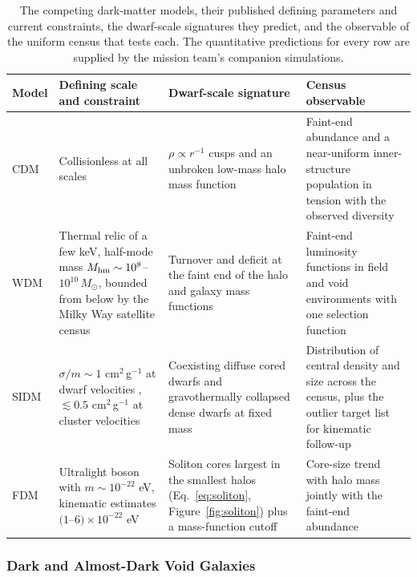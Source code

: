 \begin{table}[htbp]
\centering
\sffamily\small
\begin{tabularx}{\textwidth}{@{}p{1.3cm}p{4.6cm}p{4.4cm}X@{}}
\toprule
\textbf{Model} & \textbf{Defining scale and constraint} & \textbf{Dwarf-scale signature} & \textbf{Census observable}\\
\midrule
CDM & Collisionless at all scales \cite{bullock2017} & $\rho\propto r^{-1}$ cusps and an unbroken low-mass halo mass function \cite{deblok2010,moore1999} & Faint-end abundance and a near-uniform inner-structure population in tension with the observed diversity \cite{oman2015}\\
WDM & Thermal relic of a few keV, half-mode mass $M_{\rm hm}\sim10^{8}$--$10^{10}\,M_\odot$, bounded from below by the Milky Way satellite census \cite{nadler2021} & Turnover and deficit at the faint end of the halo and galaxy mass functions & Faint-end luminosity functions in field and void environments with one selection function\\
SIDM & $\sigma/m\sim1$ cm$^2$\,g$^{-1}$ at dwarf velocities \cite{spergel2000,tulinyu2018}, $\lesssim0.5$ cm$^2$\,g$^{-1}$ at cluster velocities \cite{harvey2015} & Coexisting diffuse cored dwarfs and gravothermally collapsed dense dwarfs at fixed mass \cite{kaplinghat2016,ren2019} & Distribution of central density and size across the census, plus the outlier target list for kinematic follow-up\\
FDM & Ultralight boson with $m\sim10^{-22}$ eV, kinematic estimates $(1$--$6)\times10^{-22}$ eV \cite{hu2000,schive2014,calabrese2016} & Soliton cores largest in the smallest halos (Eq.~\eqref{eq:soliton}, Figure~\ref{fig:soliton}) plus a mass-function cutoff & Core-size trend with halo mass jointly with the faint-end abundance\\
\bottomrule
\end{tabularx}
\caption{The competing dark-matter models, their published defining parameters and current constraints, the dwarf-scale signatures they predict, and the observable of the uniform census that tests each. The quantitative predictions for every row are supplied by the mission team's companion simulations.}
\label{tab:dmmodels}
\end{table}

\subsubsection{Dark and Almost-Dark Void Galaxies}

